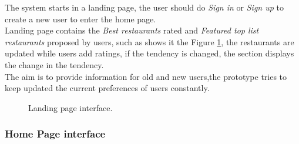 The system starts in a landing page, the user should do \textit{Sign in} or
\textit{Sign up} to create a new user to enter the home page. \\ 
Landing page contains the \textit{Best restaurants} rated and 
\textit{Featured top list restaurants}
proposed by users, such as shows it the Figure  \ref{fig:landing}, 
the restaurants are updated while users add ratings, 
if the tendency is changed, the section displays the change 
in the tendency. \\ The aim is to provide
information for old and new users,the prototype tries to keep updated
the current preferences of users constantly.
\begin{figure}
\captionsetup{font=footnotesize}
\centering
{}
\caption{Landing page interface.}
\label{fig:landing}   
\end{figure}

\subsubsection{Home Page interface}

